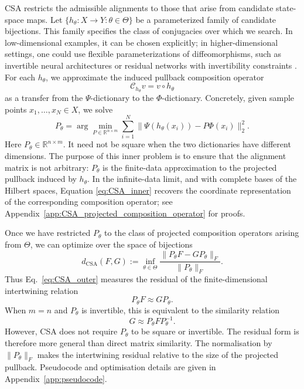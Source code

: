 \documentclass{article}
\theoremstyle{definition}
\begin{document}
CSA restricts the admissible alignments to those that arise from candidate state-space maps. Let \(\{h_\theta:X\to Y:\theta\in\Theta\}\) be a parameterized family of candidate bijections. This family specifies the class of conjugacies over which we search. In low-dimensional examples, it can be chosen explicitly; in higher-dimensional settings, one could use flexible parameterizations of diffeomorphisms, such as invertible neural architectures or residual networks with invertibility constraints \citep{chen2024dform,huang2021residual}. For each \(h_\theta\), we approximate the induced pullback composition operator
\[
    \mathcal C_{h_\theta}v = v\circ h_\theta
\]
as a transfer from the \(\Psi\)-dictionary to the \(\Phi\)-dictionary. Concretely, given sample points \(x_1,\ldots,x_N\in X\), we solve
\begin{equation}
\label{eq:CSA_inner}
    P_\theta
    =
    \arg\min_{P\in\mathbb R^{n\times m}}
    \sum_{i=1}^{N}
    \bigl\|
        \Psi(h_\theta(x_i)) - P\Phi(x_i)
    \bigr\|_2^2 .
\end{equation}
Here \(P_\theta\in\mathbb R^{n\times m}\). It need not be square when the two dictionaries have different dimensions. The purpose of this inner problem is to ensure that the alignment matrix is not arbitrary: \(P_\theta\) is the finite-data approximation to the projected pullback induced by \(h_\theta\). In the infinite-data limit, and with complete bases of the Hilbert spaces, Equation \eqref{eq:CSA_inner} recovers the coordinate representation of the corresponding composition operator; see Appendix~\ref{app:CSA_projected_composition_operator} for proofs.

Once we have restricted $P_\theta$ to the class of projected composition operators arising from $\Theta$,  we can optimize over the space of bijections
\begin{equation}
\label{eq:CSA_outer}
    d_{\mathrm{CSA}}(F,G)
    :=
    \inf_{\theta\in\Theta}
    \frac{
        \bigl\|P_\theta F - G P_\theta\bigr\|_F
    }{
        \|P_\theta\|_F
    } .
\end{equation} Thus Eq.~\eqref{eq:CSA_outer} measures the residual of the finite-dimensional intertwining relation
\[
    P_\theta F \approx G P_\theta .
\]
When \(m=n\) and \(P_\theta\) is invertible, this is equivalent to the similarity relation
\[
    G\approx P_\theta F P_\theta^{-1}.
\]
However, CSA does not require \(P_\theta\) to be square or invertible. The residual form is therefore more general than direct matrix similarity. The normalisation by \(\|P_\theta\|_F\) makes the intertwining residual relative to the size of the projected pullback. Pseudocode and optimisation details are given in Appendix~\ref{app:pseudocode}.
\end{document}
